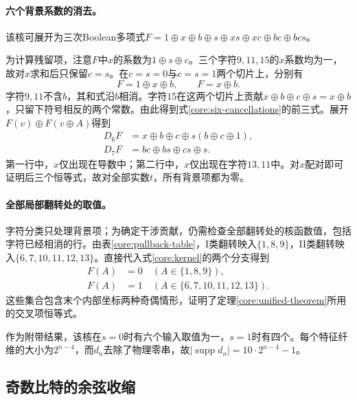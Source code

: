 \paragraph{六个背景系数的消去。}
该核可展开为三次Boolean多项式$F=1\oplus x\oplus b\oplus s\oplus xs\oplus xc\oplus bc\oplus bcs$。

为计算残留项，注意$F$中$x$的系数为$1\oplus s\oplus c$。三个字符$9,11,15$的$x$系数均为一，故对$x$求和后只保留$c=s$。在$c=s=0$与$c=s=1$两个切片上，分别有
\begin{equation}
 F=1\oplus x\oplus b,\qquad F=x\oplus b.
\end{equation}
字符$9,11$不含$b$，其和式沿$b$相消。字符$15$在这两个切片上贡献$x\oplus b\oplus c\oplus s=x\oplus b$，只留下符号相反的两个常数。由此得到式\eqref{core:six-cancellations}的前三式。展开$F(v)\oplus F(v\oplus A)$得到
\begin{align}
 D_6F&=x\oplus b\oplus c\oplus s(b\oplus c\oplus1),\nonumber\\
 D_7F&=bc\oplus bs\oplus cs\oplus s.
 \label{core:derivatives}
\end{align}
第一行中，$x$仅出现在导数中；第二行中，$x$仅出现在字符$13,11$中。对$x$配对即可证明后三个恒等式，故对全部实数$t$，所有背景项都为零。

\paragraph{全部局部翻转处的取值。}
字符分类只处理背景项；为确定干涉贡献，仍需检查全部翻转处的核函数值，包括字符已经相消的行。由表\ref{core:pullback-table}，I类翻转映入$\{1,8,9\}$，II类翻转映入$\{6,7,10,11,12,13\}$。直接代入式\eqref{core:kernel}的两个分支得到
\begin{equation}
 \begin{aligned}
 F(A)&=0\quad(A\in\{1,8,9\}),\\
 F(A)&=1\quad(A\in\{6,7,10,11,12,13\}).
 \end{aligned}
 \label{core:flip-values}
\end{equation}
这些集合包含末个内部坐标两种奇偶情形，证明了定理\ref{core:unified-theorem}所用的交叉项恒等式。


作为附带结果，该核在$s=0$时有六个输入取值为一，$s=1$时有四个。每个特征纤维的大小为$2^{n-4}$，而$d_n$去除了物理零串，故$|\operatorname{supp}d_n|=10\cdot2^{n-4}-1$。

\subsection{奇数比特的余弦收缩}
\label{core:odd-cosine}

